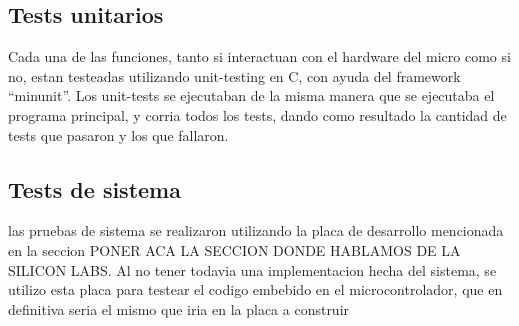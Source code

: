 \subsection{Tests unitarios} %
\label{sub:tests_unitarios}

Cada una de las funciones, tanto si interactuan con el hardware del micro como si no, estan testeadas utilizando unit-testing en C, con ayuda del framework ``minunit''\cite{minunit}. Los unit-tests se ejecutaban de la misma manera que se ejecutaba el programa principal, y corria todos los tests, dando como resultado la cantidad de tests que pasaron y los que fallaron.


\subsection{Tests de sistema} %
\label{sub:tests_de_sistema}

las pruebas de sistema se realizaron utilizando la placa de desarrollo mencionada en la seccion PONER ACA LA SECCION DONDE HABLAMOS DE LA SILICON LABS. Al no tener todavia una implementacion hecha del sistema, se utilizo esta placa para testear el codigo embebido en el microcontrolador, que en definitiva seria el mismo que iria en la placa a construir

